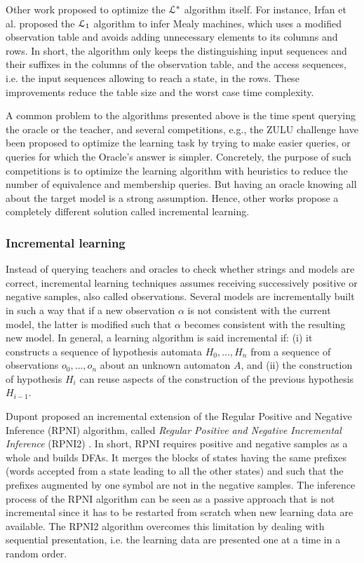 Other work proposed to optimize the $\EuScript{L}^*$ algorithm
itself. For instance, Irfan et al. proposed the $\EuScript{L}_1$
algorithm \cite{irfan12} to infer Mealy machines, which uses a
modified observation table and avoids adding unnecessary elements
to its columns and rows. In short, the algorithm only keeps the
distinguishing input sequences and their suffixes in the columns
of the observation table, and the access sequences, i.e. the
input sequences allowing to reach a state, in the rows. These
improvements reduce the table size and the worst case time
complexity.

A common problem to the algorithms presented above is the time
spent querying the oracle or the teacher, and several
competitions, e.g., the ZULU challenge \cite{zulu} have been
proposed to optimize the learning task by trying to make easier
queries, or queries for which the Oracle’s answer is simpler.
Concretely, the purpose of such competitions is to optimize the
learning algorithm with heuristics to reduce the number of
equivalence and membership queries. But having an oracle knowing
all about the target model is a strong assumption. Hence, other
works propose a completely different solution called incremental
learning.

\subsubsection{Incremental learning}
\label{sec:active-increment}

Instead of querying teachers and oracles to check whether strings
and models are correct, incremental learning techniques assumes
receiving successively positive or negative samples, also called
observations. Several models are incrementally built in such a
way that if a new observation $\alpha$ is not consistent with the
current model, the latter is modified such that $\alpha$ becomes
consistent with the resulting new model.  In general, a learning
algorithm is said incremental if: (i) it constructs a sequence of
hypothesis automata $H_0, \dots, H_n$ from a sequence of
observations $o_0, \dots, o_n$  about an unknown automaton $A$,
and (ii) the construction of hypothesis $H_i$ can reuse aspects
of the construction of the previous hypothesis $H_{i-1}$.

Dupont proposed an incremental extension of the Regular Positive
and Negative Inference (RPNI) algorithm, called \textit{Regular
Positive and Negative Incremental Inference} (RPNI2)
\cite{Dupont96incrementalregular}. In short, RPNI requires
positive and negative samples as a whole and builds DFAs. It
merges the blocks of states having the same prefixes (words
accepted from a state leading to all the other states) and such
that the prefixes augmented by one symbol are not in the negative
samples. The inference process of the RPNI algorithm can be seen
as a passive approach that is not incremental since it has to
be restarted from scratch when new learning data are available.
The RPNI2 algorithm overcomes this limitation by dealing with
sequential presentation, i.e. the learning data are presented one
at a time in a random order.

